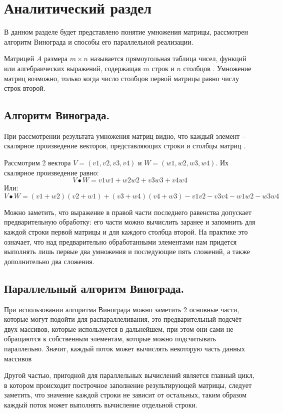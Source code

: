 \chapter{Аналитический раздел}
\label{cha:analysis}
В данном разделе будет представлено понятие умножения матрицы, рассмотрен алгоритм Винограда и способы его параллельной реализации.

\par Матрицей $A$ размера $m\times n$ называется прямоугольная таблица чисел, функций или алгебраических выражений, содержащая $m$ строк и $n$ столбцов \cite{Belousov}. Умножение матриц возможно, только когда число столбцов первой матрицы равно числу строк второй.

\section{Алгоритм Винограда.}
При рассмотрении результата умножения матриц видно, что каждый элемент -- скалярное произведение векторов, представляющих строки и столбцы матриц \cite{Algolib}.
\par Рассмотрим 2 вектора $V = (v1, v2, v3, v4)$ и $W =(w1,w2,w3,w4)$. Их скалярное произведение равно:
\begin{equation}
	V\bullet W=v1w1+w2w2+v3w3+v4w4
\end{equation}
Или:
\begin{equation}
	V\bullet W=(v1+w2)(v2+w1)+(v3+w4)(v4+w3)-v1v2-v3v4-w1w2-w3w4
\end{equation}
\par Можно заметить, что выражение в правой части последнего равенства допускает предварительную обработку: его части можно вычислить заранее и запомнить для каждой строки первой матрицы и для каждого столбца второй. На практике это означает, что над предварительно обработанными элементами нам придется выполнять лишь первые два умножения и последующие пять сложений, а также дополнительно два сложения.

\section{Параллельный алгоритм Винограда.}
При использовании алгоритма Винограда можно заметить 2 основные части, которые могут подойти для распараллеливания, это предварительный подсчёт двух массивов, которые используется в дальнейшем, при этом они сами не обращаются к собственным элементам, которые можно подсчитывать параллельно. Значит, каждый поток может вычислять некоторую часть данных массивов
\par Другой частью, пригодной для параллельных вычислений является главный цикл, в котором происходит построчное заполнение результирующей матрицы, следует заметить, что значение каждой строки не зависит от остальных, таким образом каждый поток может выполнять вычисление отдельной строки.

